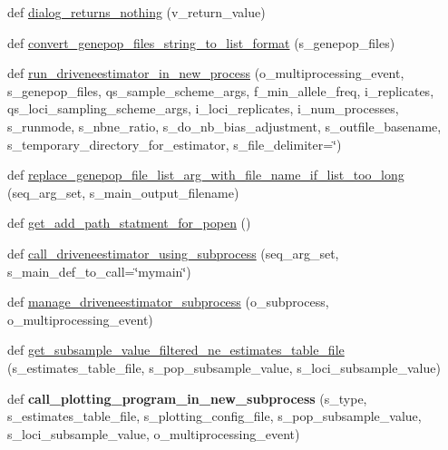 \begin{DoxyCompactItemize}
\item 
def \hyperlink{namespacenegui_1_1pgutilities_aa839d4997d2bd2c15016c33cc7fce3b0}{dialog\+\_\+returns\+\_\+nothing} (v\+\_\+return\+\_\+value)
\item 
def \hyperlink{namespacenegui_1_1pgutilities_aed0f15b22462914445ffe1ec2a77cbc8}{convert\+\_\+genepop\+\_\+files\+\_\+string\+\_\+to\+\_\+list\+\_\+format} (s\+\_\+genepop\+\_\+files)
\item 
def \hyperlink{namespacenegui_1_1pgutilities_af7487f2b883dbb694f1d34379bca0d7c}{run\+\_\+driveneestimator\+\_\+in\+\_\+new\+\_\+process} (o\+\_\+multiprocessing\+\_\+event, s\+\_\+genepop\+\_\+files, qs\+\_\+sample\+\_\+scheme\+\_\+args, f\+\_\+min\+\_\+allele\+\_\+freq, i\+\_\+replicates, qs\+\_\+loci\+\_\+sampling\+\_\+scheme\+\_\+args, i\+\_\+loci\+\_\+replicates, i\+\_\+num\+\_\+processes, s\+\_\+runmode, s\+\_\+nbne\+\_\+ratio, s\+\_\+do\+\_\+nb\+\_\+bias\+\_\+adjustment, s\+\_\+outfile\+\_\+basename, s\+\_\+temporary\+\_\+directory\+\_\+for\+\_\+estimator, s\+\_\+file\+\_\+delimiter=\char`\"{})
\item 
def \hyperlink{namespacenegui_1_1pgutilities_af0416d36a2f9a99c1658b47c5d35ac6c}{replace\+\_\+genepop\+\_\+file\+\_\+list\+\_\+arg\+\_\+with\+\_\+file\+\_\+name\+\_\+if\+\_\+list\+\_\+too\+\_\+long} (seq\+\_\+arg\+\_\+set, s\+\_\+main\+\_\+output\+\_\+filename)
\item 
def \hyperlink{namespacenegui_1_1pgutilities_a606a7615fe2e94332376016ce8abe372}{get\+\_\+add\+\_\+path\+\_\+statment\+\_\+for\+\_\+popen} ()
\item 
def \hyperlink{namespacenegui_1_1pgutilities_ad33c328d8fe2b8fe9489c512c18d1765}{call\+\_\+driveneestimator\+\_\+using\+\_\+subprocess} (seq\+\_\+arg\+\_\+set, s\+\_\+main\+\_\+def\+\_\+to\+\_\+call=\char`\"{}mymain\char`\"{})
\item 
def \hyperlink{namespacenegui_1_1pgutilities_aa62ddf0928a977844669e59f5b4e3329}{manage\+\_\+driveneestimator\+\_\+subprocess} (o\+\_\+subprocess, o\+\_\+multiprocessing\+\_\+event)
\item 
def \hyperlink{namespacenegui_1_1pgutilities_afd3d11b0299c87d3e2e92383de028857}{get\+\_\+subsample\+\_\+value\+\_\+filtered\+\_\+ne\+\_\+estimates\+\_\+table\+\_\+file} (s\+\_\+estimates\+\_\+table\+\_\+file, s\+\_\+pop\+\_\+subsample\+\_\+value, s\+\_\+loci\+\_\+subsample\+\_\+value)
\item 
def {\bfseries call\+\_\+plotting\+\_\+program\+\_\+in\+\_\+new\+\_\+subprocess} (s\+\_\+type, s\+\_\+estimates\+\_\+table\+\_\+file, s\+\_\+plotting\+\_\+config\+\_\+file, s\+\_\+pop\+\_\+subsample\+\_\+value, s\+\_\+loci\+\_\+subsample\+\_\+value, o\+\_\+multiprocessing\+\_\+event)\hypertarget{namespacenegui_1_1pgutilities_a2573590bc123ce4113500de393291824}{}\label{namespacenegui_1_1pgutilities_a2573590bc123ce4113500de393291824}


\end{DoxyCompactItemize}
